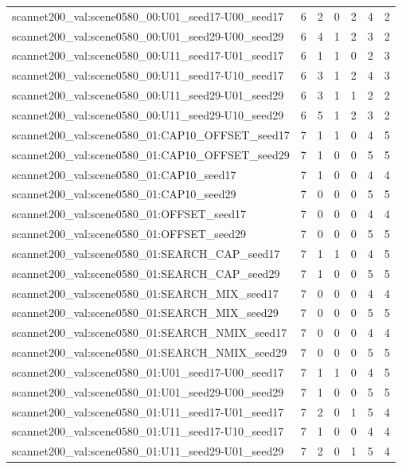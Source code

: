 \begin{table}[t]
\begin{tabular}{lrrrrrr}
scannet200\_val:scene0580\_00:U01\_seed17-U00\_seed17 & 6 & 2 & 0 & 2 & 4 & 2 \\
scannet200\_val:scene0580\_00:U01\_seed29-U00\_seed29 & 6 & 4 & 1 & 2 & 3 & 2 \\
scannet200\_val:scene0580\_00:U11\_seed17-U01\_seed17 & 6 & 1 & 1 & 0 & 2 & 3 \\
scannet200\_val:scene0580\_00:U11\_seed17-U10\_seed17 & 6 & 3 & 1 & 2 & 4 & 3 \\
scannet200\_val:scene0580\_00:U11\_seed29-U01\_seed29 & 6 & 3 & 1 & 1 & 2 & 2 \\
scannet200\_val:scene0580\_00:U11\_seed29-U10\_seed29 & 6 & 5 & 1 & 2 & 3 & 2 \\
scannet200\_val:scene0580\_01:CAP10\_OFFSET\_seed17 & 7 & 1 & 1 & 0 & 4 & 5 \\
scannet200\_val:scene0580\_01:CAP10\_OFFSET\_seed29 & 7 & 1 & 0 & 0 & 5 & 5 \\
scannet200\_val:scene0580\_01:CAP10\_seed17 & 7 & 1 & 0 & 0 & 4 & 4 \\
scannet200\_val:scene0580\_01:CAP10\_seed29 & 7 & 0 & 0 & 0 & 5 & 5 \\
scannet200\_val:scene0580\_01:OFFSET\_seed17 & 7 & 0 & 0 & 0 & 4 & 4 \\
scannet200\_val:scene0580\_01:OFFSET\_seed29 & 7 & 0 & 0 & 0 & 5 & 5 \\
scannet200\_val:scene0580\_01:SEARCH\_CAP\_seed17 & 7 & 1 & 1 & 0 & 4 & 5 \\
scannet200\_val:scene0580\_01:SEARCH\_CAP\_seed29 & 7 & 1 & 0 & 0 & 5 & 5 \\
scannet200\_val:scene0580\_01:SEARCH\_MIX\_seed17 & 7 & 0 & 0 & 0 & 4 & 4 \\
scannet200\_val:scene0580\_01:SEARCH\_MIX\_seed29 & 7 & 0 & 0 & 0 & 5 & 5 \\
scannet200\_val:scene0580\_01:SEARCH\_NMIX\_seed17 & 7 & 0 & 0 & 0 & 4 & 4 \\
scannet200\_val:scene0580\_01:SEARCH\_NMIX\_seed29 & 7 & 0 & 0 & 0 & 5 & 5 \\
scannet200\_val:scene0580\_01:U01\_seed17-U00\_seed17 & 7 & 1 & 1 & 0 & 4 & 5 \\
scannet200\_val:scene0580\_01:U01\_seed29-U00\_seed29 & 7 & 1 & 0 & 0 & 5 & 5 \\
scannet200\_val:scene0580\_01:U11\_seed17-U01\_seed17 & 7 & 2 & 0 & 1 & 5 & 4 \\
scannet200\_val:scene0580\_01:U11\_seed17-U10\_seed17 & 7 & 1 & 0 & 0 & 4 & 4 \\
scannet200\_val:scene0580\_01:U11\_seed29-U01\_seed29 & 7 & 2 & 0 & 1 & 5 & 4 \\

\end{tabular}
\end{table}
